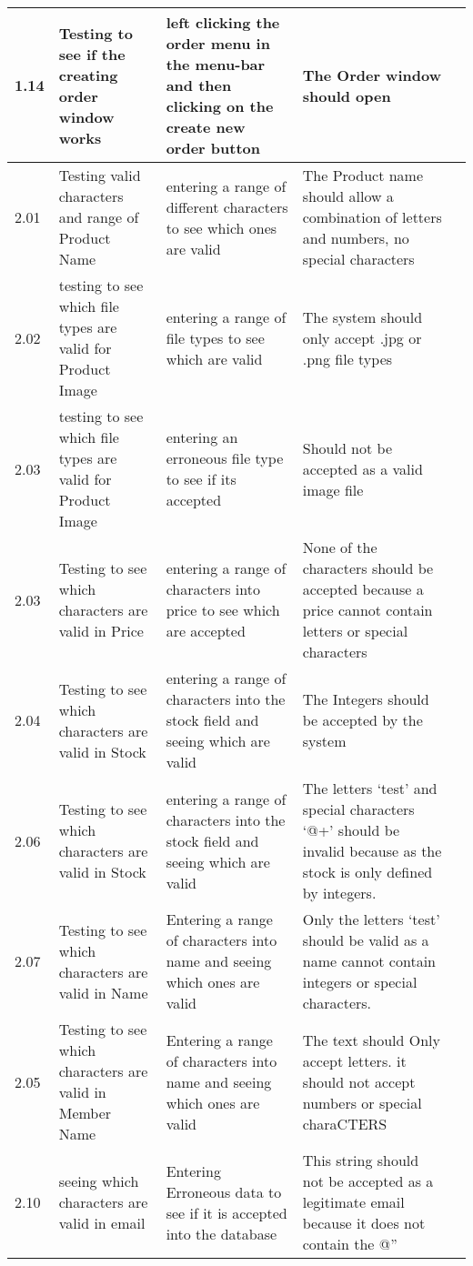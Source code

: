 \begin{flushleft}
\begin{longtable}{|p{1cm}|p{2.5cm}|p{2.5cm}|p{2cm}|p{2cm}|}
	\rowcolor{light-grey}1.14 & Testing to see if the creating order window works & left clicking the order menu in the menu-bar and then clicking on the create new order button & The Order  window should open & \\ \hline
	2.01 & Testing valid characters and range of Product Name & entering a range of different characters to see which ones are valid & The Product name should allow a combination of letters and numbers, no special characters & \\ \hline
	2.02 & testing to see which file types are valid for Product Image & entering a range of file types to see which are valid & The system should only accept .jpg or .png file types & \\ \hline
	\rowcolor{dark-grey}2.03 & testing to see which file types are valid for Product Image & entering an erroneous file type to see if its accepted &  Should not be accepted as a valid image file & \\ \hline
	2.03 & Testing to see which characters are valid in Price & entering a range of characters into price to see which are accepted &  None of the characters should be accepted because a price cannot contain letters or special characters & \\ \hline
	2.04 & Testing to see which characters are valid in Stock & entering a range of characters into the stock field and seeing which are valid  & The Integers should be accepted by the system& \\ \hline
	\rowcolor{dark-grey}2.06 & Testing to see which characters are valid in Stock & entering a range of characters into the stock field and seeing which are valid  & The letters `test' and special characters `@+' should be invalid because as the stock is only defined by integers.& \\ \hline
	\rowcolor{dark-grey}2.07 & Testing to see which characters are valid in Name & Entering a range of characters into name and seeing which ones are valid  & Only the letters `test' should be valid as a name cannot contain integers or special characters.& \\ \hline
	2.05 & Testing to see which characters are valid in Member Name & Entering a range of characters into name and seeing which ones are valid &  The text should Only accept letters. it should not accept numbers or special charaCTERS& \\ \hline
	\rowcolor{dark-grey}2.10 & seeing which characters are valid in email & Entering Erroneous data to see if it is accepted into the database  &  This string should not be accepted as a legitimate email because it does not contain the @'' & \\ \hline

\end{longtable}
\end{flushleft}
